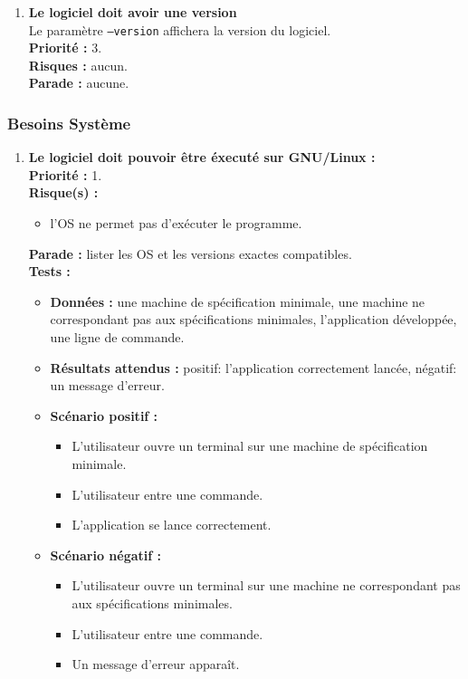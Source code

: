 \documentclass{article}
\newcommand{\code}[1]{\colorbox{light-gray}{\texttt{#1}}}
\begin{document}
\begin{enumerate}
    \item \textbf{Le logiciel doit avoir une version} \\
    Le paramètre \code{--version} affichera la version du logiciel.\\
    \textbf{Priorité :} 3. \\
    \textbf{Risques :} aucun. \\
    \textbf{Parade :} aucune.

\end{enumerate}

\subsubsection{Besoins Système}
\begin{enumerate}
    \item \textbf{Le logiciel doit pouvoir être éxecuté sur GNU/Linux :} \\
    \textbf{Priorité :} 1. \\
    \textbf{Risque(s) :} 
    \begin{itemize}
        \item l’OS ne permet pas d’exécuter le programme.
    \end{itemize}
    \textbf{Parade :} lister les OS et les versions exactes compatibles.\\
    \textbf{Tests :}
    \begin{itemize}
        \item \textbf{Données :} une machine de spécification minimale, une machine ne correspondant pas aux spécifications minimales, l'application développée, une ligne de commande.
        \item \textbf{Résultats attendus :} positif: l'application correctement lancée, négatif: un message d'erreur.
        \item \textbf{Scénario positif :}
        \begin{itemize}
            \item L’utilisateur ouvre un terminal sur une machine de spécification minimale.
            \item L’utilisateur entre une commande.
            \item L'application se lance correctement.
        \end{itemize}
        \item \textbf{Scénario négatif :}
        \begin{itemize}
            \item L’utilisateur ouvre un terminal sur une machine ne correspondant pas aux spécifications minimales.
            \item L’utilisateur entre une commande.
            \item Un message d'erreur apparaît.
        \end{itemize}
    \end{itemize}
    

\end{enumerate}
\end{document}
